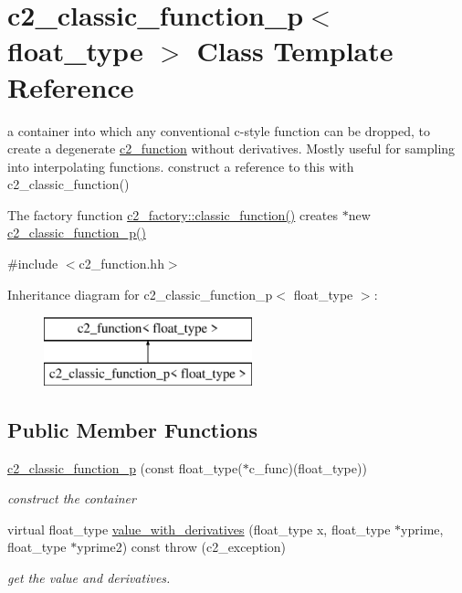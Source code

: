 \hypertarget{classc2__classic__function__p}{\section{c2\-\_\-classic\-\_\-function\-\_\-p$<$ float\-\_\-type $>$ Class Template Reference}
\label{classc2__classic__function__p}
}


a container into which any conventional c-\/style function can be dropped, to create a degenerate \hyperlink{classc2__function}{c2\-\_\-function} without derivatives. Mostly useful for sampling into interpolating functions. construct a reference to this with c2\-\_\-classic\-\_\-function()

The factory function \hyperlink{classc2__factory_ae5c9140b2bfcc6416682562b99479974}{c2\-\_\-factory\-::classic\-\_\-function()} creates $\ast$new \hyperlink{classc2__classic__function__p_a8b2d09d67a8835902fd6c684d5b183b7}{c2\-\_\-classic\-\_\-function\-\_\-p()}  




{\ttfamily \#include $<$c2\-\_\-function.\-hh$>$}

Inheritance diagram for c2\-\_\-classic\-\_\-function\-\_\-p$<$ float\-\_\-type $>$\-:\begin{figure}[H]
\begin{center}
\leavevmode
\includegraphics[height=2.000000cm]{classc2__classic__function__p}
\end{center}
\end{figure}
\subsection*{Public Member Functions}
\begin{DoxyCompactItemize}
\item 
\hyperlink{classc2__classic__function__p_a8b2d09d67a8835902fd6c684d5b183b7}{c2\-\_\-classic\-\_\-function\-\_\-p} (const float\-\_\-type($\ast$c\-\_\-func)(float\-\_\-type))
\begin{DoxyCompactList}\small\item\em construct the container \end{DoxyCompactList}\item 
virtual float\-\_\-type \hyperlink{classc2__classic__function__p_abf7fc11b0396fc249eb3300ed39b3cc3}{value\-\_\-with\-\_\-derivatives} (float\-\_\-type x, float\-\_\-type $\ast$yprime, float\-\_\-type $\ast$yprime2) const   throw (c2\-\_\-exception)
\begin{DoxyCompactList}\small\item\em get the value and derivatives. \end{DoxyCompactList}\end{DoxyCompactItemize}
